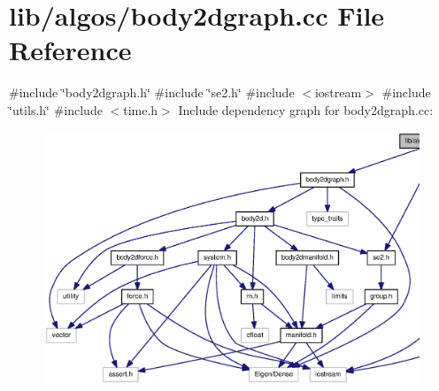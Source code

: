 \section{lib/algos/body2dgraph.cc \-File \-Reference}
\label{body2dgraph_8cc}
{\ttfamily \#include \char`\"{}body2dgraph.\-h\char`\"{}}\*
{\ttfamily \#include \char`\"{}se2.\-h\char`\"{}}\*
{\ttfamily \#include $<$iostream$>$}\*
{\ttfamily \#include \char`\"{}utils.\-h\char`\"{}}\*
{\ttfamily \#include $<$time.\-h$>$}\*
\-Include dependency graph for body2dgraph.\-cc\-:
\nopagebreak
\begin{figure}[H]
\begin{center}
\leavevmode
\includegraphics[width=350pt]{body2dgraph_8cc__incl}
\end{center}
\end{figure}
